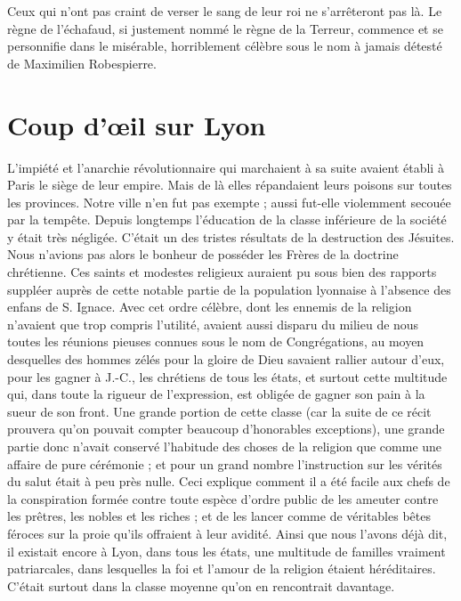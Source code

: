 Ceux qui n'ont pas craint de verser le sang de leur roi ne s'arrêteront pas là. Le règne de l'échafaud, si justement nommé le règne de la Terreur, commence et se personnifie dans le misérable, horriblement célèbre sous le nom à jamais détesté de Maximilien Robespierre.

\section*{Coup d'œil sur Lyon}
L'impiété et l'anarchie révolutionnaire qui marchaient à sa suite avaient établi à Paris le siège de leur empire. Mais de là elles répandaient leurs poisons sur toutes les provinces. Notre ville n'en fut pas exempte ; aussi fut-elle violemment secouée par la tempête. Depuis longtemps l'éducation de la classe inférieure de la société y était très négligée. C'était un des tristes résultats de la destruction des Jésuites. Nous n'avions pas alors le bonheur de posséder les Frères de la doctrine chrétienne. Ces saints et modestes religieux auraient pu sous bien des rapports suppléer auprès de cette notable partie de la population lyonnaise à l'absence des enfans de S. Ignace. Avec cet ordre célèbre, dont les ennemis de la religion n'avaient que trop compris l'utilité, avaient aussi disparu du milieu de nous toutes les réunions pieuses connues sous le nom de Congrégations, au moyen desquelles des hommes zélés pour la gloire de Dieu savaient rallier autour d'eux,
pour les gagner à J.-C., les chrétiens de tous les états, et surtout cette multitude qui, dans toute la rigueur de l'expression, est obligée de gagner son pain à la sueur de son front. Une grande portion de cette classe (car la suite de ce récit prouvera qu'on pouvait compter beaucoup d'honorables exceptions), une grande partie donc n'avait conservé l'habitude des choses de la religion que comme une affaire de pure cérémonie ; et pour un grand nombre l'instruction sur les vérités du salut était à peu près nulle. Ceci explique comment il a été facile aux chefs de la conspiration formée contre toute espèce d'ordre public de les ameuter contre les prêtres, les nobles et les riches ; et de les lancer comme de véritables bêtes féroces sur la proie qu'ils offraient à leur avidité. Ainsi que nous l'avons déjà dit, il existait encore à Lyon, dans tous les états, une multitude de familles vraiment patriarcales, dans lesquelles la foi et l'amour de la religion étaient héréditaires. C'était surtout dans la classe moyenne qu'on en rencontrait davantage.

